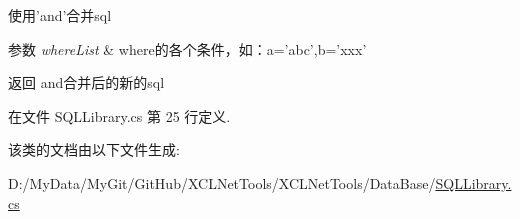 使用'and'合并sql 


\begin{DoxyParams}{参数}
{\em where\-List} & where的各个条件，如：a='abc',b='xxx'\\
\hline
\end{DoxyParams}
\begin{DoxyReturn}{返回}
and合并后的新的sql
\end{DoxyReturn}


在文件 S\-Q\-L\-Library.\-cs 第 25 行定义.



该类的文档由以下文件生成\-:\begin{DoxyCompactItemize}
\item 
D\-:/\-My\-Data/\-My\-Git/\-Git\-Hub/\-X\-C\-L\-Net\-Tools/\-X\-C\-L\-Net\-Tools/\-Data\-Base/\hyperlink{_s_q_l_library_8cs}{S\-Q\-L\-Library.\-cs}\end{DoxyCompactItemize}
